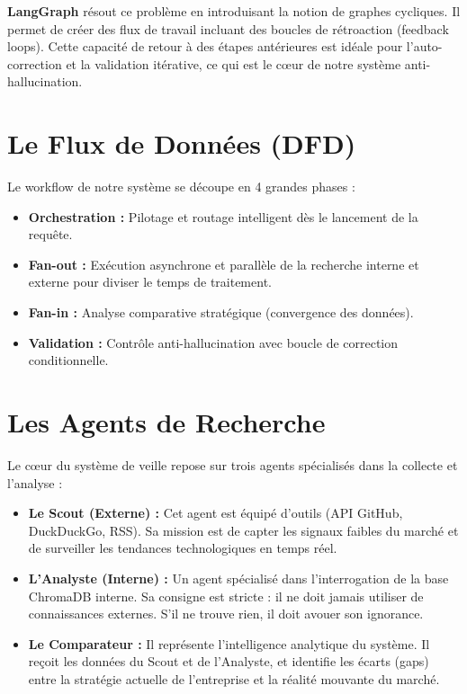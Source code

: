 \documentclass[12pt,a4paper]{report}
\begin{document}
\textbf{LangGraph} résout ce problème en introduisant la notion de graphes cycliques. Il permet de créer des flux de travail incluant des boucles de rétroaction (feedback loops). Cette capacité de retour à des étapes antérieures est idéale pour l'auto-correction et la validation itérative, ce qui est le cœur de notre système anti-hallucination.

\section{Le Flux de Données (DFD)}
Le workflow de notre système se découpe en 4 grandes phases :
\begin{itemize}
    \item \textbf{Orchestration :} Pilotage et routage intelligent dès le lancement de la requête.
    \item \textbf{Fan-out :} Exécution asynchrone et parallèle de la recherche interne et externe pour diviser le temps de traitement.
    \item \textbf{Fan-in :} Analyse comparative stratégique (convergence des données).
    \item \textbf{Validation :} Contrôle anti-hallucination avec boucle de correction conditionnelle.
\end{itemize}

\section{Les Agents de Recherche}
Le cœur du système de veille repose sur trois agents spécialisés dans la collecte et l'analyse :
\begin{itemize}
    \item \textbf{Le Scout (Externe) :} Cet agent est équipé d'outils (API GitHub, DuckDuckGo, RSS). Sa mission est de capter les signaux faibles du marché et de surveiller les tendances technologiques en temps réel.
    \item \textbf{L'Analyste (Interne) :} Un agent spécialisé dans l'interrogation de la base ChromaDB interne. Sa consigne est stricte : il ne doit jamais utiliser de connaissances externes. S'il ne trouve rien, il doit avouer son ignorance.
    \item \textbf{Le Comparateur :} Il représente l'intelligence analytique du système. Il reçoit les données du Scout et de l'Analyste, et identifie les écarts (gaps) entre la stratégie actuelle de l'entreprise et la réalité mouvante du marché.
\end{itemize}
\end{document}
